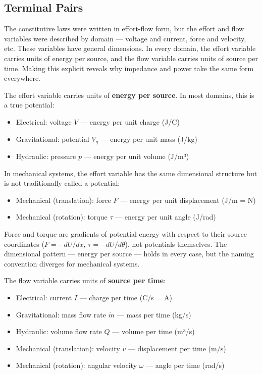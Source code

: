 \documentclass[
  letterpaper,
  DIV=11,
  numbers=noendperiod]{scrartcl}
\providecommand{\tightlist}{%
  \setlength{\itemsep}{0pt}\setlength{\parskip}{0pt}}
\begin{document}
\subsection{Terminal Pairs}\label{terminal-pairs}

The constitutive laws were written in effort-flow form, but the effort
and flow variables were described by domain --- voltage and current,
force and velocity, etc. These variables have general dimensions. In
every domain, the effort variable carries units of energy per source,
and the flow variable carries units of source per time. Making this
explicit reveals why impedance and power take the same form everywhere.

The effort variable carries units of \textbf{energy per source}. In most
domains, this is a true potential:

\begin{itemize}
\tightlist
\item
  Electrical: voltage \(V\) --- energy per unit charge (J/C)
\item
  Gravitational: potential \(V_g\) --- energy per unit mass (J/kg)
\item
  Hydraulic: pressure \(p\) --- energy per unit volume (J/m³)
\end{itemize}

In mechanical systems, the effort variable has the same dimensional
structure but is not traditionally called a potential:

\begin{itemize}
\tightlist
\item
  Mechanical (translation): force \(F\) --- energy per unit displacement
  (J/m = N)
\item
  Mechanical (rotation): torque \(\tau\) --- energy per unit angle
  (J/rad)
\end{itemize}

Force and torque are gradients of potential energy with respect to their
source coordinates (\(F = -dU/dx\), \(\tau = -dU/d\theta\)), not
potentials themselves. The dimensional pattern --- energy per source ---
holds in every case, but the naming convention diverges for mechanical
systems.

The flow variable carries units of \textbf{source per time}:

\begin{itemize}
\tightlist
\item
  Electrical: current \(I\) --- charge per time (C/s = A)
\item
  Gravitational: mass flow rate \(\dot{m}\) --- mass per time (kg/s)
\item
  Hydraulic: volume flow rate \(Q\) --- volume per time (m³/s)
\item
  Mechanical (translation): velocity \(v\) --- displacement per time
  (m/s)
\item
  Mechanical (rotation): angular velocity \(\omega\) --- angle per time
  (rad/s)
\end{itemize}
\end{document}
